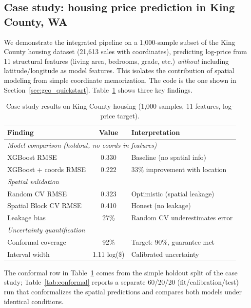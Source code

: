 \documentclass[article]{jss}
\begin{document}
\subsection{Case study: housing price prediction in King County, WA}

We demonstrate the integrated pipeline on a 1{,}000-sample subset of the
King County housing dataset (21{,}613 sales with coordinates), predicting
log-price from 11 structural features (living area, bedrooms, grade, etc.)
\emph{without} including latitude/longitude as model features. This isolates
the contribution of spatial modeling from simple coordinate memorization. The
code is the one shown in Section~\ref{sec:geo_quickstart}.
Table~\ref{tab:casestudy} shows three key findings.

\begin{table}[t!]
\centering
\begin{tabular}{lcl}
\toprule
Finding & Value & Interpretation \\
\midrule
\multicolumn{3}{l}{\textit{Model comparison (holdout, no coords in features)}} \\
XGBoost RMSE          & 0.330 & Baseline (no spatial info) \\
XGBoost + coords RMSE & 0.222 & 33\% improvement with location \\
\midrule
\multicolumn{3}{l}{\textit{Spatial validation}} \\
Random CV RMSE        & 0.323 & Optimistic (spatial leakage) \\
Spatial Block CV RMSE & 0.410 & Honest (no leakage) \\
Leakage bias          & 27\%  & Random CV underestimates error \\
\midrule
\multicolumn{3}{l}{\textit{Uncertainty quantification}} \\
Conformal coverage    & 92\%  & Target: 90\%, guarantee met \\
Interval width        & 1.11 log(\$) & Calibrated uncertainty \\
\bottomrule
\end{tabular}
\caption{\label{tab:casestudy} Case study results on King County housing
(1{,}000 samples, 11 features, log-price target).}
\end{table}

The conformal row in Table~\ref{tab:casestudy} comes from the simple holdout
split of the case study; Table~\ref{tab:conformal} reports a separate 60/20/20
(fit/calibration/test) run that conformalizes the spatial predictions and
compares both models under identical conditions.
\end{document}
